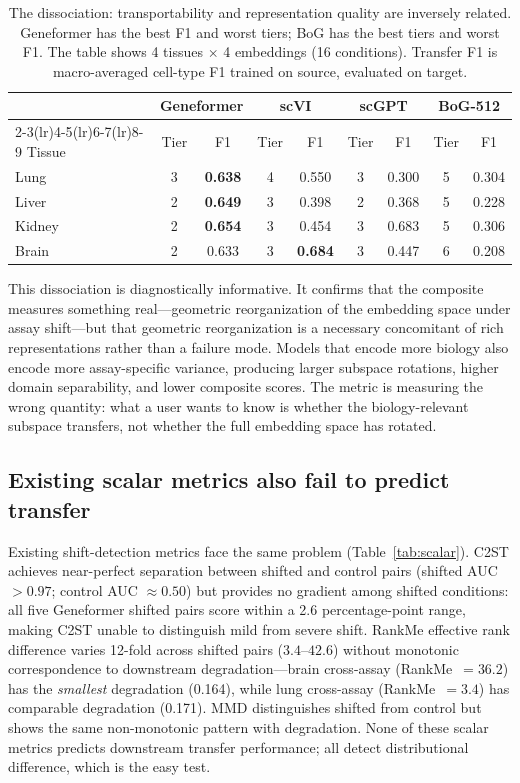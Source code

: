 \documentclass[9pt,lineno]{elife}
\begin{document}
\begin{table}[t]
\centering
\caption{The dissociation: transportability and representation quality are inversely related. Geneformer has the best F1 and worst tiers; BoG has the best tiers and worst F1. The table shows 4 tissues $\times$ 4 embeddings (16 conditions). Transfer F1 is macro-averaged cell-type F1 trained on source, evaluated on target.}
\label{tab:dissociation}
\small
\begin{tabular}{@{}lcccccccc@{}}
\toprule
 & \multicolumn{2}{c}{Geneformer} & \multicolumn{2}{c}{scVI} & \multicolumn{2}{c}{scGPT} & \multicolumn{2}{c}{BoG-512} \\
\cmidrule(lr){2-3}\cmidrule(lr){4-5}\cmidrule(lr){6-7}\cmidrule(lr){8-9}
Tissue & Tier & F1 & Tier & F1 & Tier & F1 & Tier & F1 \\
\midrule
Lung   & 3 & \textbf{0.638} & 4 & 0.550 & 3 & 0.300 & 5 & 0.304 \\
Liver  & 2 & \textbf{0.649} & 3 & 0.398 & 2 & 0.368 & 5 & 0.228 \\
Kidney & 2 & \textbf{0.654} & 3 & 0.454 & 3 & 0.683 & 5 & 0.306 \\
Brain  & 2 & 0.633 & 3 & \textbf{0.684} & 3 & 0.447 & 6 & 0.208 \\
\bottomrule
\end{tabular}
\end{table}

This dissociation is diagnostically informative. It confirms that the composite measures something real---geometric reorganization of the embedding space under assay shift---but that geometric reorganization is a necessary concomitant of rich representations rather than a failure mode. Models that encode more biology also encode more assay-specific variance, producing larger subspace rotations, higher domain separability, and lower composite scores. The metric is measuring the wrong quantity: what a user wants to know is whether the biology-relevant subspace transfers, not whether the full embedding space has rotated.

\subsection{Existing scalar metrics also fail to predict transfer}

Existing shift-detection metrics face the same problem (Table~\ref{tab:scalar}). C2ST achieves near-perfect separation between shifted and control pairs (shifted AUC $> 0.97$; control AUC $\approx 0.50$) but provides no gradient among shifted conditions: all five Geneformer shifted pairs score within a 2.6 percentage-point range, making C2ST unable to distinguish mild from severe shift. RankMe effective rank difference varies 12-fold across shifted pairs ($3.4$--$42.6$) without monotonic correspondence to downstream degradation---brain cross-assay (RankMe~$= 36.2$) has the \emph{smallest} degradation (0.164), while lung cross-assay (RankMe~$= 3.4$) has comparable degradation (0.171). MMD distinguishes shifted from control but shows the same non-monotonic pattern with degradation. None of these scalar metrics predicts downstream transfer performance; all detect distributional difference, which is the easy test.
\end{document}
